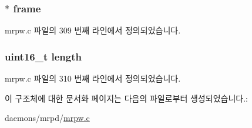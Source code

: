 \subsubsection[{\texorpdfstring{frame}{frame}}]{$\ast$ frame}\hypertarget{structnetif__thread__data_af2e8f7e8583d0d7c40fe4ea5620f857e}{}\label{structnetif__thread__data_af2e8f7e8583d0d7c40fe4ea5620f857e}


mrpw.\+c 파일의 309 번째 라인에서 정의되었습니다.

\subsubsection[{\texorpdfstring{length}{length}}]{\setlength{\rightskip}{0pt plus 5cm}uint16\+\_\+t length}\hypertarget{structnetif__thread__data_a1892eba2086d12ac2b09005aeb09ea3b}{}\label{structnetif__thread__data_a1892eba2086d12ac2b09005aeb09ea3b}


mrpw.\+c 파일의 310 번째 라인에서 정의되었습니다.



이 구조체에 대한 문서화 페이지는 다음의 파일로부터 생성되었습니다.\+:\begin{DoxyCompactItemize}
\item 
daemons/mrpd/\hyperlink{mrpw_8c}{mrpw.\+c}\end{DoxyCompactItemize}
